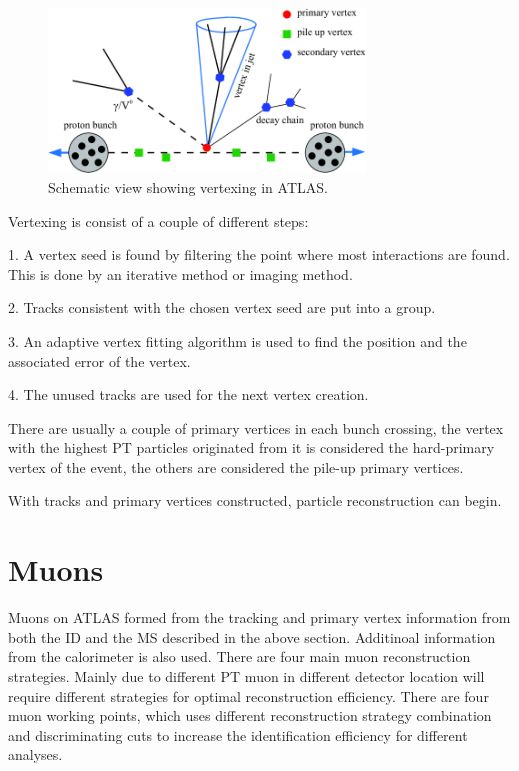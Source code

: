\begin{figure}[!htb]
    \begin{center}
        \includegraphics[width=0.75\textwidth]{figures/common_ana/Vertex}
        \caption{        
            Schematic view showing vertexing in ATLAS\cite{4774734}.
        }
    \end{center}
\end{figure}
Vertexing is consist of a couple of different steps:

1. A vertex seed is found by filtering the point where most interactions are found. This is done by an iterative method or imaging method.  

2. Tracks consistent with the chosen vertex seed are put into a group.

3. An adaptive vertex fitting algorithm is used to find the position and the associated error of the vertex. 

4. The unused tracks are used for the next vertex creation. 

There are usually a couple of primary vertices in each bunch crossing, the vertex with the highest PT particles originated from it is considered the hard-primary vertex of the event, the others are considered the pile-up primary vertices. 

With tracks and primary vertices constructed, particle reconstruction can begin. 


\section{Muons}
Muons on ATLAS formed from the tracking and primary vertex information from both the ID and the MS described in the above section. Additinoal information from the calorimeter is also used. There are four main muon reconstruction strategies. Mainly due to different PT muon in different detector location will require different strategies for optimal reconstruction efficiency. There are four muon working points, which uses different reconstruction strategy combination and discriminating cuts to
increase the identification efficiency for different analyses.


